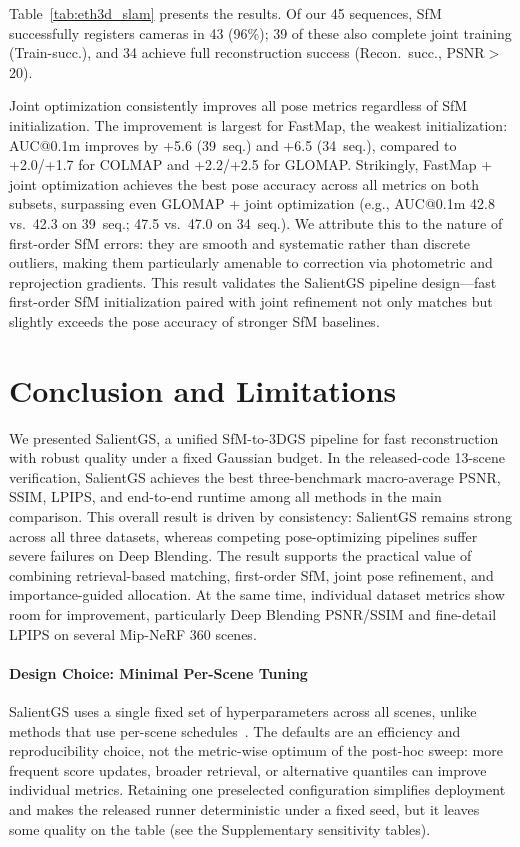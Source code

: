\documentclass[sigconf]{acmart}
\begin{document}
Table~\ref{tab:eth3d_slam} presents the results. Of our 45 sequences, SfM successfully registers cameras in 43 (96\%); 39 of these also complete joint training (Train-succ.), and 34 achieve full reconstruction success (Recon.\ succ., PSNR${>}$20).

Joint optimization consistently improves all pose metrics regardless of SfM initialization. The improvement is largest for FastMap, the weakest initialization: AUC@0.1m improves by +5.6 (39~seq.) and +6.5 (34~seq.), compared to +2.0/+1.7 for COLMAP and +2.2/+2.5 for GLOMAP. Strikingly, FastMap + joint optimization achieves the best pose accuracy across all metrics on both subsets, surpassing even GLOMAP + joint optimization (e.g., AUC@0.1m 42.8 vs.\ 42.3 on 39~seq.; 47.5 vs.\ 47.0 on 34~seq.). We attribute this to the nature of first-order SfM errors: they are smooth and systematic rather than discrete outliers, making them particularly amenable to correction via photometric and reprojection gradients. This result validates the SalientGS pipeline design---fast first-order SfM initialization paired with joint refinement not only matches but slightly exceeds the pose accuracy of stronger SfM baselines.

\section{Conclusion and Limitations}
\label{sec:conclusion}

We presented SalientGS, a unified SfM-to-3DGS pipeline for fast reconstruction with robust quality under a fixed Gaussian budget. In the released-code 13-scene verification, SalientGS achieves the best three-benchmark macro-average PSNR, SSIM, LPIPS, and end-to-end runtime among all methods in the main comparison. This overall result is driven by consistency: SalientGS remains strong across all three datasets, whereas competing pose-optimizing pipelines suffer severe failures on Deep Blending. The result supports the practical value of combining retrieval-based matching, first-order SfM, joint pose refinement, and importance-guided allocation. At the same time, individual dataset metrics show room for improvement, particularly Deep Blending PSNR/SSIM and fine-detail LPIPS on several Mip-NeRF 360 scenes.

\paragraph{Design Choice: Minimal Per-Scene Tuning}
SalientGS uses a single fixed set of hyperparameters across all scenes, unlike methods that use per-scene schedules~\cite{mcmc3dgs,ren2025fastgs}. The defaults are an efficiency and reproducibility choice, not the metric-wise optimum of the post-hoc sweep: more frequent score updates, broader retrieval, or alternative quantiles can improve individual metrics. Retaining one preselected configuration simplifies deployment and makes the released runner deterministic under a fixed seed, but it leaves some quality on the table (see the Supplementary sensitivity tables).
\end{document}
